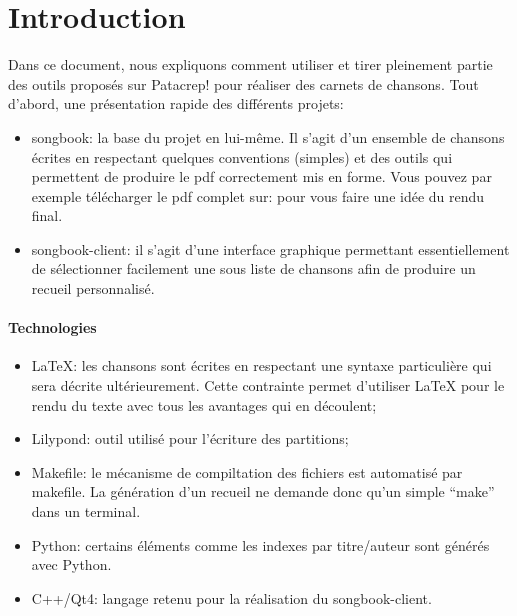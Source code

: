\documentclass[versionenligne]{patacrep}
\begin{document}

\thispagestyle{empty}
\tableofcontents \newpage

\section*{Introduction}

Dans ce document, nous expliquons comment utiliser et tirer pleinement
partie des outils proposés sur Patacrep! pour réaliser des carnets de
chansons. Tout d'abord, une présentation rapide des différents projets:

\begin{itemize}
\item songbook: la base du projet en lui-même. Il s'agit d'un ensemble de chansons écrites en respectant quelques conventions (simples) et des outils qui permettent de produire le pdf correctement mis en forme. Vous pouvez par exemple télécharger le pdf complet sur: pour vous faire une idée du rendu final.
\item songbook-client: il s'agit d'une interface graphique permettant essentiellement de sélectionner facilement une sous liste de chansons afin de produire un recueil personnalisé. 
\end{itemize}

\paragraph{Technologies}
\begin{itemize}
\item \LaTeX: les chansons sont écrites en respectant une syntaxe particulière qui
  sera décrite ultérieurement. Cette contrainte permet d'utiliser \LaTeX
  pour le rendu du texte avec tous les avantages qui en découlent;
\item Lilypond: outil utilisé pour l'écriture des partitions;
\item Makefile: le mécanisme de compiltation des fichiers est automatisé par makefile. 
  La génération d'un recueil ne demande donc qu'un simple ``make'' dans un terminal.
\item Python: certains éléments comme les indexes par titre/auteur sont générés avec Python.
\item C++/Qt4: langage retenu pour la réalisation du songbook-client.
\end{itemize}
\end{document}
